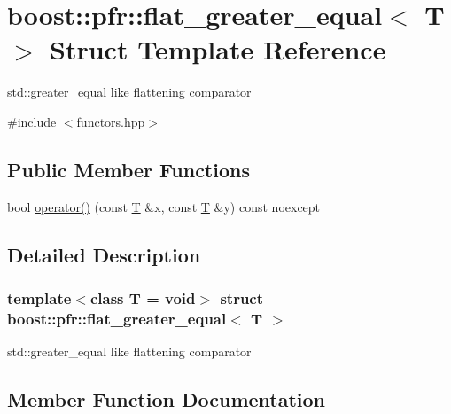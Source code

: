 \hypertarget{structboost_1_1pfr_1_1flat__greater__equal}{}\section{boost\+:\+:pfr\+:\+:flat\+\_\+greater\+\_\+equal$<$ T $>$ Struct Template Reference}
\label{structboost_1_1pfr_1_1flat__greater__equal}


std\+::greater\+\_\+equal like flattening comparator  




{\ttfamily \#include $<$functors.\+hpp$>$}

\subsection*{Public Member Functions}
\begin{DoxyCompactItemize}
\item 
bool \mbox{\hyperlink{structboost_1_1pfr_1_1flat__greater__equal_a43d9d8ca7757154ea70edd3547167318}{operator()}} (const \mbox{\hyperlink{struct_t}{T}} \&x, const \mbox{\hyperlink{struct_t}{T}} \&y) const noexcept
\end{DoxyCompactItemize}


\subsection{Detailed Description}
\subsubsection*{template$<$class T = void$>$\newline
struct boost\+::pfr\+::flat\+\_\+greater\+\_\+equal$<$ T $>$}

std\+::greater\+\_\+equal like flattening comparator 

\subsection{Member Function Documentation}
\mbox{\label{structboost_1_1pfr_1_1flat__greater__equal_a43d9d8ca7757154ea70edd3547167318}} 
